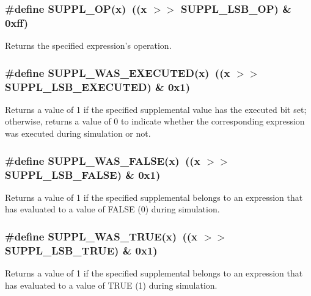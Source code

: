 \subsubsection{\setlength{\rightskip}{0pt plus 5cm}\#define SUPPL\_\-OP(x)\ ((x $>$$>$ SUPPL\_\-LSB\_\-OP) \& 0xff)}\label{group__expr__suppl_a19}


Returns the specified expression's operation. 
\subsubsection{\setlength{\rightskip}{0pt plus 5cm}\#define SUPPL\_\-WAS\_\-EXECUTED(x)\ ((x $>$$>$ SUPPL\_\-LSB\_\-EXECUTED) \& 0x1)}\label{group__expr__suppl_a12}


Returns a value of 1 if the specified supplemental value has the executed bit set; otherwise, returns a value of 0 to indicate whether the corresponding expression was executed during simulation or not. 
\subsubsection{\setlength{\rightskip}{0pt plus 5cm}\#define SUPPL\_\-WAS\_\-FALSE(x)\ ((x $>$$>$ SUPPL\_\-LSB\_\-FALSE) \& 0x1)}\label{group__expr__suppl_a16}


Returns a value of 1 if the specified supplemental belongs to an expression that has evaluated to a value of FALSE (0) during simulation. 
\subsubsection{\setlength{\rightskip}{0pt plus 5cm}\#define SUPPL\_\-WAS\_\-TRUE(x)\ ((x $>$$>$ SUPPL\_\-LSB\_\-TRUE) \& 0x1)}\label{group__expr__suppl_a15}


Returns a value of 1 if the specified supplemental belongs to an expression that has evaluated to a value of TRUE (1) during simulation. 